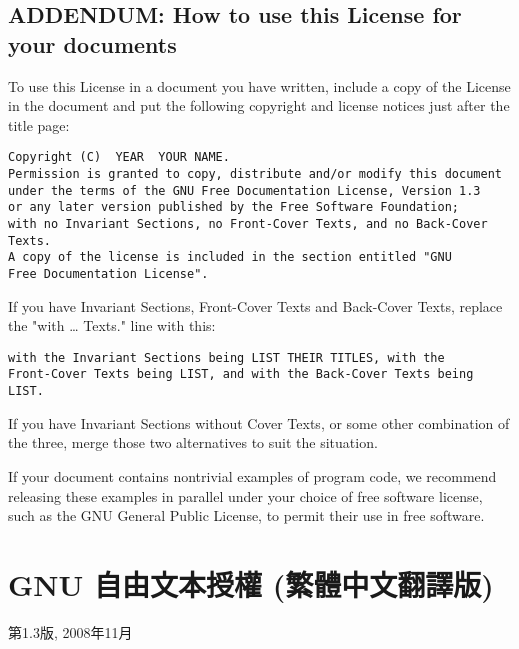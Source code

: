 \section{ADDENDUM: How to use this License for your documents}
To use this License in a document you have written, include a copy of the License in the document and put the following copyright and license notices just after the title page:\par
\begin{verbatim}
Copyright (C)  YEAR  YOUR NAME.
Permission is granted to copy, distribute and/or modify this document
under the terms of the GNU Free Documentation License, Version 1.3
or any later version published by the Free Software Foundation;
with no Invariant Sections, no Front-Cover Texts, and no Back-Cover Texts.
A copy of the license is included in the section entitled "GNU
Free Documentation License".
\end{verbatim}    
If you have Invariant Sections, Front-Cover Texts and Back-Cover Texts, replace the "with … Texts." line with this:
\begin{verbatim}
with the Invariant Sections being LIST THEIR TITLES, with the
Front-Cover Texts being LIST, and with the Back-Cover Texts being LIST.
\end{verbatim}  
If you have Invariant Sections without Cover Texts, or some other combination of the three, merge those two alternatives to suit the situation.\par
If your document contains nontrivial examples of program code, we recommend releasing these examples in parallel under your choice of free software license, such as the GNU General Public License, to permit their use in free software. 

\chapter{GNU 自由文本授權 (繁體中文翻譯版)}
第1.3版, 2008年11月
